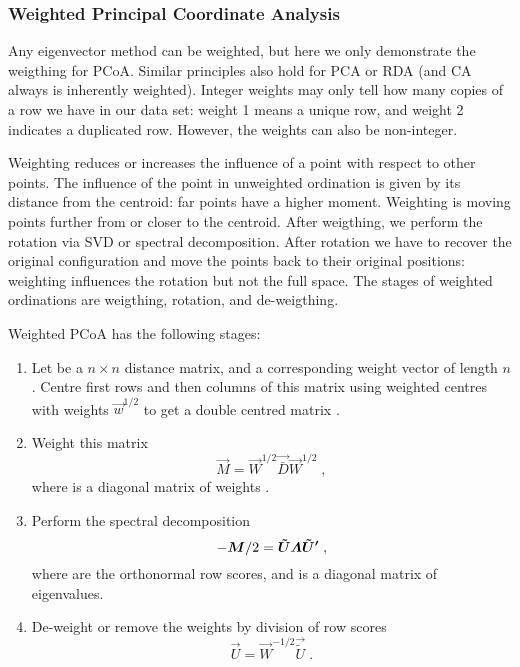 \subsubsection{Weighted Principal Coordinate Analysis}

Any eigenvector method can be weighted, but here we only demonstrate
the weigthing for PCoA.  Similar principles also hold for PCA or RDA
(and CA always is inherently weighted).  Integer weights may only tell
how many copies of a row we have in our data set: weight 1 means a
unique row, and weight 2 indicates a duplicated row. However, the
weights can also be non-integer.

Weighting reduces or increases the influence of a point with respect
to other points. The influence of the point in unweighted ordination
is given by its distance from the centroid: far points have a higher
moment. Weighting is moving points further from or closer to the
centroid.  After weigthing, we perform the rotation via SVD or
spectral decomposition. After rotation we have to recover the original
configuration and move the points back to their original positions:
weighting influences the rotation but not the full space.  The stages
of weighted ordinations are weigthing, rotation, and de-weigthing.

Weighted PCoA has the following stages:
\begin{enumerate}
\item Let  be a $n \times n$ distance matrix, and  a
  corresponding weight vector of length $n$.  Centre first rows and
  then columns of this matrix using weighted centres with weights
  $\vec{w}^{1/2}$ to get a double centred matrix .
\item Weight this matrix
  \begin{equation}
    \vec{M} = \vec{W}^{1/2} \vec{\bar D} \vec{W}^{1/2}\;,
  \end{equation}
  where  is a diagonal matrix of weights .
\item Perform the spectral decomposition
  \begin{equation}
    -\vec{M}/2 = \vec{\tilde U} \bLambda \vec{\tilde U'}\;,
  \end{equation}
  where  are the orthonormal row scores, and
  \vec{\bLambda} is a diagonal matrix of eigenvalues.
\item De-weight or remove the weights by division of row scores
  \begin{equation}
    \vec{U} = \vec{W}^{-1/2} \vec{\tilde U}\;.
  \end{equation}
\end{enumerate}

